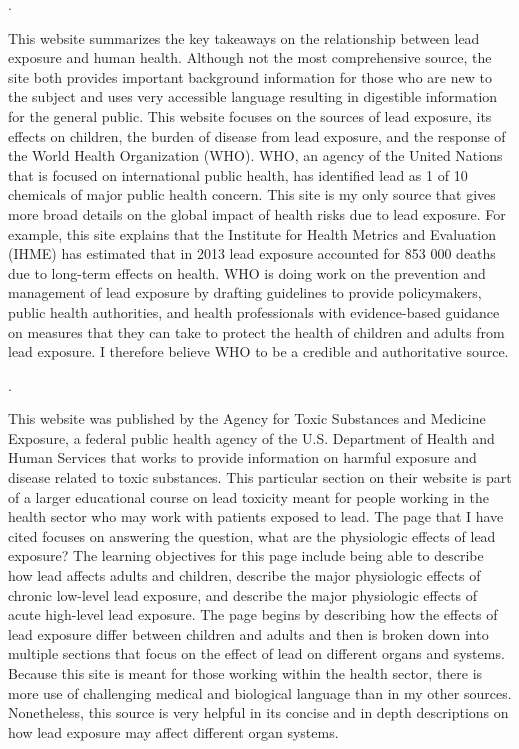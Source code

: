 \documentclass{article}
\begin{document}
\bigskip

. 

\bigskip
This website summarizes the key takeaways on the relationship between lead exposure and human health. Although not the most comprehensive source, the site both provides important background information for those who are new to the subject and uses very accessible language resulting in digestible information for the general public. This website focuses on the sources of lead exposure, its effects on children, the burden of disease from lead exposure, and the response of the World Health Organization (WHO). WHO, an agency of the United Nations that is focused on international public health, has identified lead as 1 of 10 chemicals of major public health concern. This site is my only source that gives more broad details on the global impact of health risks due to lead exposure. For example, this site explains that the Institute for Health Metrics and Evaluation (IHME) has estimated that in 2013 lead exposure accounted for 853 000 deaths due to long-term effects on health. WHO is doing work on the prevention and management of lead exposure by drafting guidelines to provide policymakers, public health authorities, and health professionals with evidence-based guidance on measures that they can take to protect the health of children and adults from lead exposure. I therefore believe WHO to be a credible and authoritative source. 

\bigskip

. 

\bigskip
This website was published by the Agency for Toxic Substances and Medicine Exposure, a federal public health agency of the U.S. Department of Health and Human Services that works to provide information on harmful exposure and disease related to toxic substances. This particular section on their website is part of a larger educational course on lead toxicity meant for people working in the health sector who may work with patients exposed to lead. The page that I have cited focuses on answering the question, what are the physiologic effects of lead exposure? The learning objectives for this page include being able to describe how lead affects adults and children, describe the major physiologic effects of chronic low-level lead exposure, and describe the major physiologic effects of acute high-level lead exposure. The page begins by describing how the effects of lead exposure differ between children and adults and then is broken down into multiple sections that focus on the effect of lead on different organs and systems. Because this site is meant for those working within the health sector, there is more use of challenging medical and biological language than in my other sources. Nonetheless, this source is very helpful in its concise and in depth descriptions on how lead exposure may affect different organ systems. 
\end{document}

